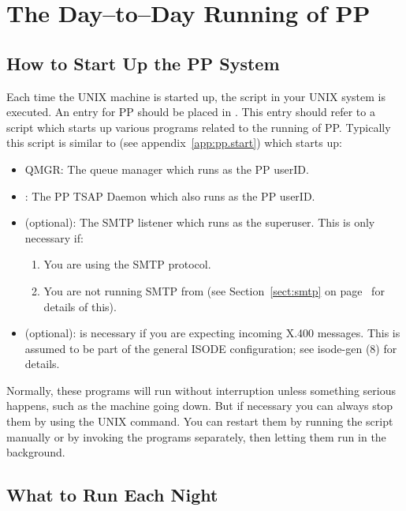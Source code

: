 \section {The Day--to--Day Running of PP}

\subsection  {How to Start Up the PP System}

Each time the UNIX machine is started up, the  script
in your UNIX system is executed.  An entry for PP should be placed in
.  This entry should refer to a script which starts up
various programs related to the running of PP.  Typically this script
is similar to  (see appendix~\ref{app:pp.start}) which
starts up:
\begin{itemize}
\item QMGR: The queue manager which runs as the PP userID.
\item {}: The PP TSAP Daemon which also runs as the PP userID.
\item {} (optional): The SMTP listener which runs as the
superuser. This is only necessary if:
	\begin{enumerate}
	\item	You are using the SMTP protocol.  	
	\item	You are not running SMTP from  (see
		Section~\ref{sect:smtp} on page~\pageref{sect:smtp}
		for details of this). 
	\end{enumerate}
\item {} (optional): is necessary if you are expecting
incoming X.400 messages. This is assumed to be part of the general
ISODE configuration; see
\linebreak
\man isode-gen (8) for details.
\end{itemize}

Normally, these programs will run without interruption unless something
serious happens, such as the machine going down.  But if necessary you
can always stop them by using the UNIX  command.
You can restart them by running the script manually or by invoking
the programs separately, then letting them run in the background. 

\subsection {What to Run Each Night}

